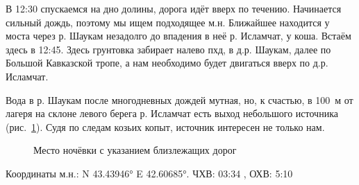 В 12:30 спускаемся на дно долины, дорога идёт вверх по течению. Начинается сильный дождь, поэтому мы ищем подходящее м.н. Ближайшее находится у моста через р. Шаукам незадолго до впадения в неё р. Исламчат, у коша. Встаём здесь в 12:45. Здесь грунтовка забирает налево пхд, в д.р. Шаукам, далее по Большой Кавказской тропе, а нам необходимо будет двигаться вверх по д.р. Исламчат.

Вода в р. Шаукам после многодневных дождей мутная, но, к счастью, в 100~м от лагеря на склоне левого берега р. Исламчат есть выход небольшого источника (рис.~\ref{fig:mn910}). Судя по следам козьих копыт, источник интересен не только нам.

\begin{figure}[h!]
	\centering
	\caption{Место ночёвки с указанием близлежащих дорог}
	\label{fig:mn910}
\end{figure}

Координаты м.н.: N 43.43946° E 42.60685°. ЧХВ: 03:34 , ОХВ: 5:10
\clearpage
